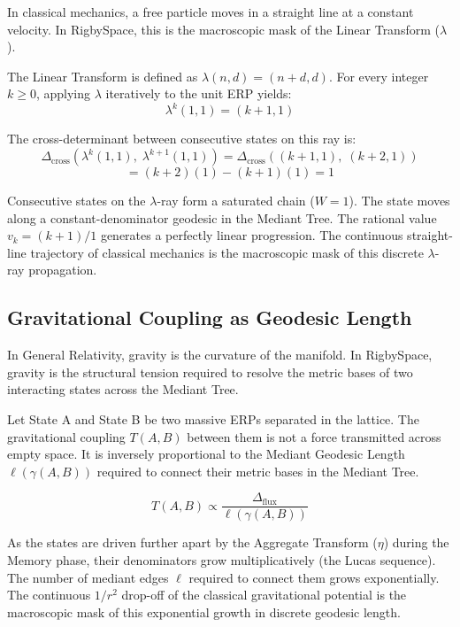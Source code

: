 \documentclass[11pt, letterpaper]{article}
\newcommand{\Dcross}{\Delta_{\mathrm{cross}}}
\newcommand{\aop}{\eta}
\newcommand{\lop}{\lambda}
\begin{document}
In classical mechanics, a free particle moves in a straight line at a constant velocity. In RigbySpace, this is the macroscopic mask of the Linear Transform ($\lop$).

\begin{theorem}[The $\lop$-Ray is Saturated]\label{thm:lop_ray}
\begin{rsbox}
The Linear Transform is defined as $\lop(n, d) = (n + d, d)$.
For every integer $k \ge 0$, applying $\lop$ iteratively to the unit ERP yields:
\[ \lop^k(1, 1) = (k + 1, 1) \]

The cross-determinant between consecutive states on this ray is:
\[ \Dcross(\lop^k(1, 1),\; \lop^{k+1}(1, 1)) = \Dcross((k+1, 1),\; (k+2, 1)) \]
\[ = (k+2)(1) - (k+1)(1) = 1 \]

Consecutive states on the $\lop$-ray form a saturated chain ($W=1$). The state moves along a constant-denominator geodesic in the Mediant Tree. The rational value $v_k = (k+1)/1$ generates a perfectly linear progression. The continuous straight-line trajectory of classical mechanics is the macroscopic mask of this discrete $\lop$-ray propagation.
\end{rsbox}
\end{theorem}

\subsection{Gravitational Coupling as Geodesic Length}

In General Relativity, gravity is the curvature of the manifold. In RigbySpace, gravity is the structural tension required to resolve the metric bases of two interacting states across the Mediant Tree.

\begin{theorem}\label{thm:grav_geodesic}
\begin{rsbox}
Let State A and State B be two massive ERPs separated in the lattice.
The gravitational coupling $T(A,B)$ between them is not a force transmitted across empty space. It is inversely proportional to the Mediant Geodesic Length $\ell(\gamma(A,B))$ required to connect their metric bases in the Mediant Tree.

\[ T(A,B) \propto \frac{\Delta_{\text{flux}}}{\ell(\gamma(A,B))} \]

As the states are driven further apart by the Aggregate Transform ($\aop$) during the Memory phase, their denominators grow multiplicatively (the Lucas sequence). The number of mediant edges $\ell$ required to connect them grows exponentially. The continuous $1/r^2$ drop-off of the classical gravitational potential is the macroscopic mask of this exponential growth in discrete geodesic length.
\end{rsbox}
\end{theorem}
\end{document}
